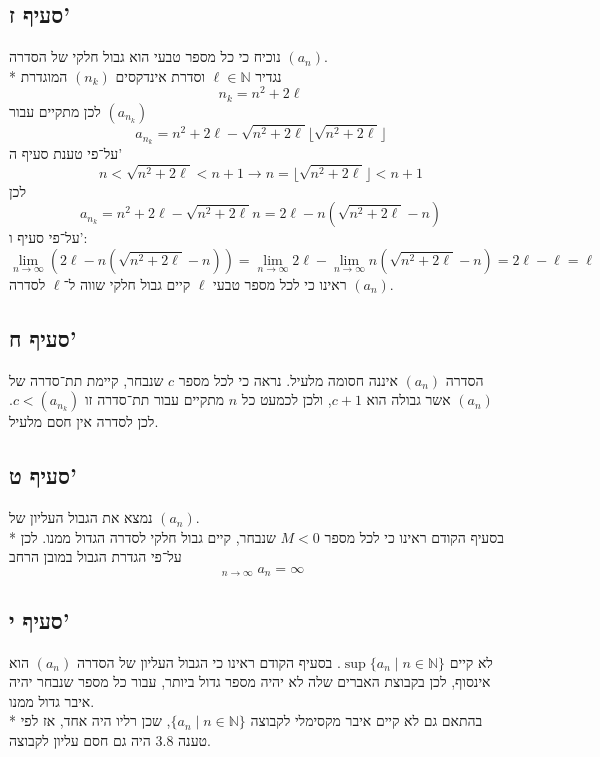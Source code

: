 \documentclass[a4paper]{article}
\DeclareMathOperator*\uplim{\overline{lim}}
\def\NN{\mathbb{N}}
\begin{document}
\subsection{סעיף ז'}
נוכיח כי כל מספר טבעי הוא גבול חלקי של הסדרה $(a_n)$. \\*
נגדיר $\ell \in \NN$ וסדרת אינדקסים $(n_k)$ המוגדרת
\[
	n_k = n^2 + 2\ell
\]
לכן מתקיים עבור $(a_{n_k})$
\[
	a_{n_k} =
	n^2 + 2\ell - \sqrt{n^2 + 2\ell} \lfloor \sqrt{n^2 + 2\ell} \rfloor
\]
על־פי טענת סעיף ה'
\[
	n < \sqrt{n^2 + 2\ell} < n + 1
	\rightarrow
	n = \lfloor \sqrt{n^2 + 2\ell} \rfloor < n + 1
\]
לכן
\[
	a_{n_k} =
	n^2 + 2\ell - \sqrt{n^2 + 2\ell} n = 2\ell - n(\sqrt{n^2 + 2\ell} - n)
\]
על־פי סעיף ו':
\[
	\lim_{n \to \infty} \left( 2\ell - n(\sqrt{n^2 + 2\ell} - n) \right)
	= \lim_{n \to \infty} 2\ell - \lim_{n \to \infty} n(\sqrt{n^2 + 2\ell} - n)
	= 2\ell - \ell = \ell
\]
ראינו כי לכל מספר טבעי $\ell$ קיים גבול חלקי שווה ל־$\ell$ לסדרה $(a_n)$.

\subsection{סעיף ח'}
הסדרה $(a_n)$ איננה חסומה מלעיל.
נראה כי לכל מספר $c$ שנבחר, קיימת תת־סדרה של $(a_n)$
אשר גבולה הוא $c + 1$, ולכן לכמעט כל $n$ מתקיים 
עבור תת־סדרה זו $c < (a_{n_k})$.
לכן לסדרה אין חסם מלעיל.

\subsection{סעיף ט'}
נמצא את הגבול העליון של $(a_n)$. \\*
בסעיף הקודם ראינו כי לכל מספר $M < 0$ שנבחר,
קיים גבול חלקי לסדרה הגדול ממנו.
לכן על־פי הגדרת הגבול במובן הרחב
\[
	\uplim_{n \to \infty} a_n = \infty
\]

\subsection{סעיף י'}
לא קיים $\sup\{ a_n \mid n \in \NN \}$.
בסעיף הקודם ראינו כי הגבול העליון של הסדרה $(a_n)$
הוא אינסוף, לכן בקבוצת האברים שלה לא יהיה מספר גדול ביותר,
עבור כל מספר שנבחר יהיה איבר גדול ממנו. \\*
בהתאם גם לא קיים איבר מקסימלי לקבוצה $\{ a_n \mid n \in \NN \}$,
שכן רליו היה אחד, אז לפי טענה 3.8 היה גם חסם עליון לקבוצה.
\end{document}
